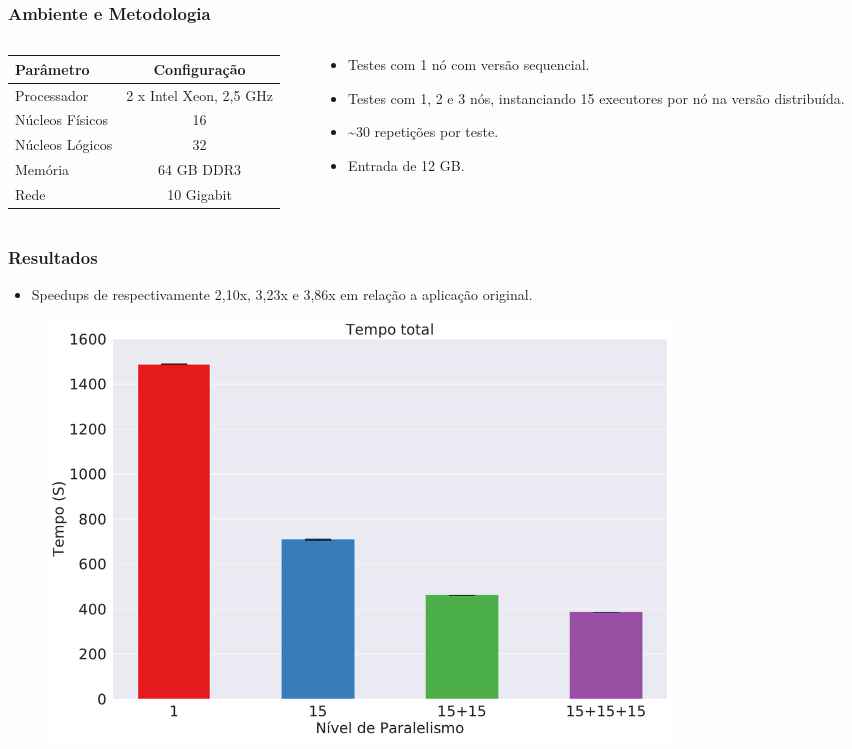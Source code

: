 \documentclass{beamer}
\begin{document}
\begin{frame}
 \frametitle{Ambiente e Metodologia}
 \begin{columns}[T] %
  \begin{column}{.55\textwidth}
 \begin{table}[H]
  \centering
  \small
  \begin{tabular}{l c} \toprule
  \textbf{Parâmetro}  &  \textbf{Configuração} \\ 
  \midrule
  Processador     & 2 x Intel Xeon, 2,5 GHz\\
  Núcleos Físicos    & 16  \\
  Núcleos Lógicos   & 32   \\
  Memória       & 64 GB DDR3  \\
  Rede	      &  10 Gigabit \\
  \bottomrule
  \end{tabular}
  \end{table}
  \end{column}%
  \hfill%
  \begin{column}{.41\textwidth}
  \begin{itemize}
   \item Testes com 1 nó com versão sequencial.
   \item Testes com 1, 2 e 3 nós, instanciando 15 executores por nó na versão 
distribuída.
   \item \textasciitilde30 repetições por teste.
   \item Entrada de 12 GB.
  \end{itemize}
  \end{column}%
  \end{columns}
\end{frame}


\begin{frame}
 \frametitle{Resultados}
 \begin{itemize}
  \item Speedups de respectivamente 2,10x, 3,23x e 3,86x em relação a aplicação 
original.
 \end{itemize}
 \begin{figure}[ht]
  \centerline{
  \includegraphics[width=0.8\textwidth]{./img/total.pdf}}
  \end{figure}
\end{frame}
\end{document}
